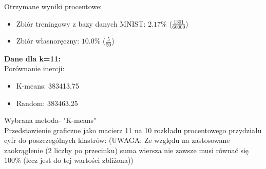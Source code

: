 \documentclass[a4paper,14pt]{report}
\begin{document}
	Otrzymane wyniki procentowe:
	\begin{itemize}
		\item Zbiór treningowy z bazy danych MNIST: $2.17\%$ ($\frac{1301}{60000}$)
		\item Zbiór własnoręczny: $10.0\%$ ($\frac{5}{50}$)
	\end{itemize}
	\textbf{Dane dla k=11: } \\
	Porównanie inercji: 
	\begin{itemize}
		\item K-means: 383413.75
		\item Random: 383463.25
	\end{itemize}
	Wybrana metoda- "K-means" \\
	Przedstawienie graficzne jako macierz 11 na 10 rozkładu procentowego przydziału cyfr do poszczególnych klastrów:
	(UWAGA: Ze względu na zastosowane zaokrąglenie (2 liczby po przecinku) suma wiersza nie zawsze musi równać się $100\%$ (lecz jest do tej wartości zbliżona))
\end{document}
